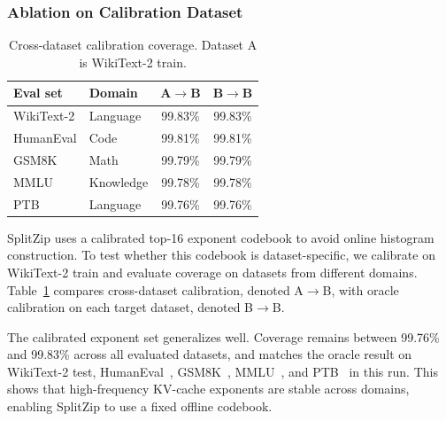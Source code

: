 \subsubsection{Ablation on Calibration Dataset}
\label{sec:ablation_calibration}

\begin{table}
    \vspace{-1.2em}
    \centering
    \caption{Cross-dataset calibration coverage. Dataset A is WikiText-2 train.}
    \label{tab:ablation_calibration}
    \scriptsize
    \setlength{\tabcolsep}{5pt}
    \renewcommand{\arraystretch}{1.08}
    \begin{tabular}{llcc}
        \toprule
        \textbf{Eval set} & \textbf{Domain} & \textbf{A$\rightarrow$B} & \textbf{B$\rightarrow$B} \\
        \midrule
        WikiText-2 & Language & 99.83\% & 99.83\% \\
        HumanEval & Code & 99.81\% & 99.81\% \\
        GSM8K & Math & 99.79\% & 99.79\% \\
        MMLU & Knowledge & 99.78\% & 99.78\% \\
        PTB & Language & 99.76\% & 99.76\% \\
        \bottomrule
    \end{tabular}
    \vspace{-1.7em}
\end{table}

SplitZip uses a calibrated top-16 exponent codebook to avoid online histogram construction.
To test whether this codebook is dataset-specific, we calibrate on WikiText-2 train and evaluate coverage on datasets from different domains.
Table~\ref{tab:ablation_calibration} compares cross-dataset calibration, denoted A$\rightarrow$B, with oracle calibration on each target dataset, denoted B$\rightarrow$B.

The calibrated exponent set generalizes well.
Coverage remains between 99.76\% and 99.83\% across all evaluated datasets, and matches the oracle result on WikiText-2 test, HumanEval~\cite{chen2021humaneval}, GSM8K~\cite{cobbe2021gsm8k}, MMLU~\cite{hendrycks2021mmlu}, and PTB~\cite{zhou2020ptb} in this run.
This shows that high-frequency KV-cache exponents are stable across domains, enabling SplitZip to use a fixed offline codebook.

